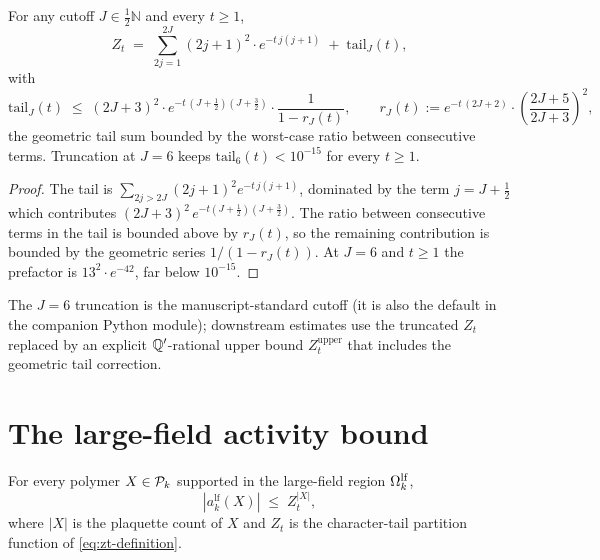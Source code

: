 \begin{proposition}
\label{prop:zt-truncation}
For any cutoff $J \in \tfrac12\mathbb{N}$ and every $t \ge 1$,
\begin{equation}
  \label{eq:zt-truncation}
  Z_t
  \;=\;
  \sum_{2j = 1}^{2J} (2j+1)^2 \cdot e^{-t\,j(j+1)}
  \;+\; \mathrm{tail}_{J}(t) ,
\end{equation}
with
\begin{equation}
  \label{eq:zt-tail-bound}
  \mathrm{tail}_{J}(t)
  \;\le\;
  (2J + 3)^2 \cdot e^{-t\,(J + \tfrac12)(J + \tfrac32)}
  \cdot \frac{1}{1 - r_J(t)},
  \qquad
  r_J(t) := e^{-t\,(2J + 2)} \cdot \left(\frac{2J+5}{2J+3}\right)^2 ,
\end{equation}
the geometric tail sum bounded by the worst-case ratio between
consecutive terms.  Truncation at $J = 6$ keeps $\mathrm{tail}_6(t)
< 10^{-15}$ for every $t \ge 1$.
\end{proposition}

\begin{proof}
The tail is $\sum_{2j > 2J} (2j+1)^2 e^{-t\,j(j+1)}$, dominated by
the term $j = J + \tfrac12$ which contributes
$(2J+3)^2\,e^{-t(J+\tfrac12)(J+\tfrac32)}$.  The ratio between
consecutive terms in the tail is bounded above by $r_J(t)$, so the
remaining contribution is bounded by the geometric series
$1/(1 - r_J(t))$.  At $J = 6$ and $t \ge 1$ the prefactor is $13^2
\cdot e^{-42}$, far below $10^{-15}$.
\end{proof}

The $J = 6$ truncation is the manuscript-standard cutoff
(it is also the default in the companion Python module);
downstream estimates use the truncated $Z_t$ replaced by an
explicit $\mathbb{Q}'$-rational upper bound $Z_t^{\mathrm{upper}}$ that
includes the geometric tail correction.

\section{The large-field activity bound}
\label{sec:lf-activity}

%

\begin{theorem}
\label{thm:large-field-activity}
For every polymer $X \in \mathcal{P}_k$ supported in the large-field
region $\Omega_k^{\mathrm{lf}}$,
\begin{equation}
  \label{eq:large-field-activity}
  |a_k^{\mathrm{lf}}(X)| \;\le\; Z_t^{|X|},
\end{equation}
where $|X|$ is the plaquette count of $X$ and $Z_t$ is the
character-tail partition function of \eqref{eq:zt-definition}.
\end{theorem}

